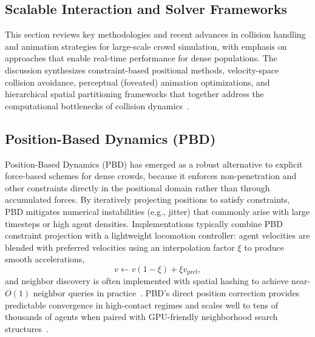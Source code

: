 %
\subsection{Scalable Interaction and Solver Frameworks}
\label{sec:solvers}

This section reviews key methodologies and recent advances in collision handling and animation strategies for large-scale crowd simulation, with emphasis on approaches that enable real-time performance for dense populations. The discussion synthesizes constraint-based positional methods, velocity-space collision avoidance, perceptual (foveated) animation optimizations, and hierarchical spatial partitioning frameworks that together address the computational bottlenecks of collision dynamics~\cite{weiss,charlton,stancu,sung}.

\subsection{Position-Based Dynamics (PBD)}
Position-Based Dynamics (PBD) has emerged as a robust alternative to explicit force-based schemes for dense crowds, because it enforces non-penetration and other constraints directly in the positional domain rather than through accumulated forces. By iteratively projecting positions to satisfy constraints, PBD mitigates numerical instabilities (e.g., jitter) that commonly arise with large timesteps or high agent densities. Implementations typically combine PBD constraint projection with a lightweight locomotion controller: agent velocities are blended with preferred velocities using an interpolation factor $\xi$ to produce smooth accelerations,
\[
v \gets v(1 - \xi) + \xi v_{\mathrm{pref}},
\]
and neighbor discovery is often implemented with spatial hashing to achieve near-$O(1)$ neighbor queries in practice~\cite{weiss}. PBD's direct position correction provides predictable convergence in high-contact regimes and scales well to tens of thousands of agents when paired with GPU-friendly neighborhood search structures~\cite{weiss}.

